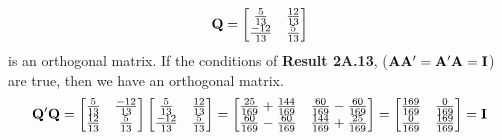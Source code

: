 \begin{enumerate}[font=\bfseries]
        \[
            \bold{Q} = \begin{bmatrix}
                \frac{5}{13} & \frac{12}{13} \\
                \frac{-12}{13} & \frac{5}{13}
            \end{bmatrix}
        \]
        is an orthogonal matrix.
        \newline
        \newline
        If the conditions of \textbf{Result 2A.13}, ($\bold{A}\bold{A}^\prime = \bold{A}^\prime \bold{A} = \bold{I}$) are true, then we have an orthogonal matrix.
        \[
            \bold{Q}^\prime \bold{Q} = 
            \begin{bmatrix}
                \frac{5}{13} & \frac{-12}{13} \\
                \frac{12}{13} & \frac{5}{13}
            \end{bmatrix}
            \begin{bmatrix}
                \frac{5}{13} & \frac{12}{13} \\
                \frac{-12}{13} & \frac{5}{13}
            \end{bmatrix} =
            \begin{bmatrix}
                \frac{25}{169} + \frac{144}{169} & \frac{60}{169} - \frac{60}{169} \\
                \frac{60}{169} - \frac{60}{169} & \frac{144}{169} + \frac{25}{169}
            \end{bmatrix} =
            \begin{bmatrix}
                \frac{169}{169} & \frac{0}{169} \\
                \frac{0}{169} & \frac{169}{169}
            \end{bmatrix} =
            \bold{I}
        \]


\end{enumerate}
